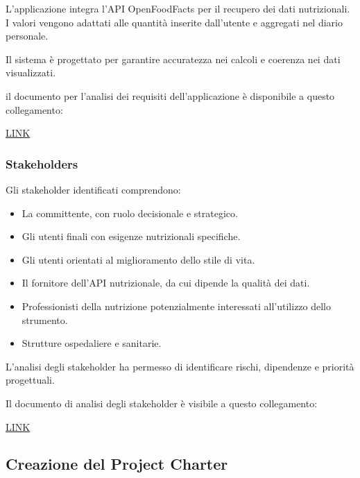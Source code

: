 \documentclass[a4paper,12pt]{article}
\begin{document}
    L'applicazione integra l'API OpenFoodFacts per il recupero dei dati nutrizionali. I valori vengono adattati alle quantità inserite dall'utente e aggregati nel diario personale.

    Il sistema è progettato per garantire accuratezza nei calcoli e coerenza nei dati visualizzati.

    il documento per l'analisi dei requisiti dell'applicazione è disponibile a questo collegamento:

    \href{https://gitlab.com/ismailbarakat68/nutriapp/-/raw/documentazioneSprint3/Documentazione/documentazioneLatex/analisi_requisiti.pdf?ref_type=heads&inline=true}{LINK}


    \subsubsection{Stakeholders}

    Gli stakeholder identificati comprendono:

    \begin{itemize}
        \item La committente, con ruolo decisionale e strategico.
        \item Gli utenti finali con esigenze nutrizionali specifiche.
        \item Gli utenti orientati al miglioramento dello stile di vita.
        \item Il fornitore dell'API nutrizionale, da cui dipende la qualità dei dati.
        \item Professionisti della nutrizione potenzialmente interessati all'utilizzo dello strumento.
        \item Strutture ospedaliere e sanitarie.
    \end{itemize}

    L'analisi degli stakeholder ha permesso di identificare rischi, dipendenze e priorità progettuali.

    Il documento di analisi degli stakeholder è visibile a questo collegamento:

    \href{https://gitlab.com/ismailbarakat68/nutriapp/-/raw/documentazioneSprint3/Documentazione/documentazioneLatex/analisi_stakeholders.pdf?ref_type=heads&inline=true}{LINK}


    \subsection{Creazione del Project Charter}
\end{document}
